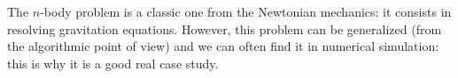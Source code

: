

The $n$-body problem is a classic one from the Newtonian mechanics: it consists in resolving gravitation equations.
However, this problem can be generalized (from the algorithmic point of view) and we can often find it in numerical simulation: this is why it is a good real case study.

